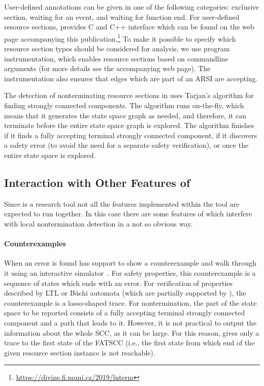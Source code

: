 User-defined annotations can be given in one of the following categories: exclusive section,
 waiting for an event, and
 waiting for function end.
For user-defined resource sections, \divine provides C and C++ interface which can be found on the web page accompanying this publication.\footnote{\url{https://divine.fi.muni.cz/2019/lnterm}}
To make it possible to specify which resource section types should be considered
for analysis, we use program instrumentation, which enables resource sections
based on commandline arguments (for more details see the accompanying web page).
The instrumentation also ensures that edges which are part of an ARSI are accepting.

The detection of nonterminating resource sections in \divine uses Tarjan's algorithm for finding strongly connected components.
The algorithm runs on-the-fly, which means that it generates the state space
graph as needed, and therefore, it can terminate before the entire state space graph is explored.
The algorithm finishes if it finds a fully accepting terminal strongly connected
component, if it discovers a safety error (to avoid the need for a separate
safety verification), or once the entire state space is explored.


\subsection{Interaction with Other Features of \divine}

Since \divine is a research tool not all the features implemented within the
tool are expected to run together. In this case there are some
features of \divine which interfere with local nontermination detection
in a not so obvious way.


\paragraph{Counterexamples}

When an error is found \divine has support to show a counterexample and walk through it using an interactive simulator~\cite{BBK+17}.
For safety properties, this counterexample is a sequence of states which ends with an error.
For verification of properties described by LTL or Büchi automata (which are partially supported by \divine), the counterexample is a lasso-shaped trace.
For nontermination, the  part of the state space to be reported consists of a fully
accepting terminal strongly connected component and a path that leads to it.
However, it is not practical to output the information about the whole SCC, as it can be large.
For this reason, \divine gives only a trace to the first state of the FATSCC (i.e., the first state from which end of the given resource section instance is not reachable).

